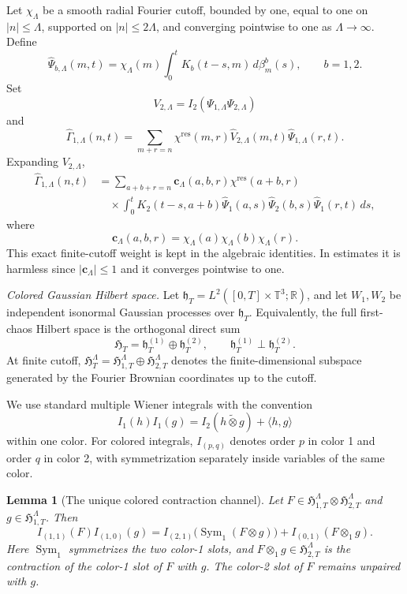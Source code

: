 \documentclass[10pt]{amsart}
\numberwithin{equation}{section}
\theoremstyle{plain}
\newtheorem{lemma}[theorem]{Lemma}
\theoremstyle{definition}
\theoremstyle{remark}
\newcommand{\T}{\mathbb{T}}
\newcommand{\R}{\mathbb{R}}
\newcommand{\wh}{\widehat}
\newcommand{\HH}{\mathfrak{H}}
\newcommand{\hh}{\mathfrak{h}}
\providecommand{\Sym}{\operatorname{Sym}}
\begin{document}
Let \(\chi_\Lambda\) be a smooth radial Fourier cutoff, bounded by one, equal to one on \(|n|\le \Lambda\), supported on \(|n|\le2\Lambda\), and converging pointwise to one as \(\Lambda\to\infty\).  Define
\[
        \wh\Psi_{b,\Lambda}(m,t)
        =\chi_\Lambda(m)\int_0^tK_b(t-s,m)\,d\beta_m^b(s),
        \qquad b=1,2.
\]
Set
\[
        V_{2,\Lambda}=I_2(\Psi_{1,\Lambda}\Psi_{2,\Lambda})
\]
and
\begin{equation}\label{C:Gamma-cutoff-def}
        \wh\Gamma_{1,\Lambda}(n,t)
        =\sum_{m+r=n}\chi^{\mathrm{res}}(m,r)
        \wh V_{2,\Lambda}(m,t)\wh\Psi_{1,\Lambda}(r,t).
\end{equation}
Expanding \(V_{2,\Lambda}\),
\begin{equation}\label{C:Gamma-expanded}
\begin{aligned}
        \wh\Gamma_{1,\Lambda}(n,t)
        & =
        \sum_{a+b+r=n}
        \mathbf c_\Lambda(a,b,r)
        \chi^{\mathrm{res}}(a+b,r)                                      \\
        &\quad\times
        \int_0^t K_2(t-s,a+b)
        \wh\Psi_1(a,s)\wh\Psi_2(b,s)\wh\Psi_1(r,t)\,ds,
\end{aligned}
\end{equation}
where
\[
        \mathbf c_\Lambda(a,b,r)=\chi_\Lambda(a)\chi_\Lambda(b)\chi_\Lambda(r).
\]
This exact finite-cutoff weight is kept in the algebraic identities.  In estimates it is harmless since \(|\mathbf c_\Lambda|\le1\) and it converges pointwise to one.

\medskip
\noindent\emph{Colored Gaussian Hilbert space.}
Let \(\hh_T=L^2([0,T]\times\T^3;\R)\), and let \(W_1,W_2\) be independent isonormal Gaussian processes over \(\hh_T\).  Equivalently, the full first-chaos Hilbert space is the orthogonal direct sum
\[
        \HH_T=\hh_T^{(1)}\oplus\hh_T^{(2)},
        \qquad
        \hh_T^{(1)}\perp\hh_T^{(2)}.
\]
At finite cutoff, \(\HH_T^\Lambda=\HH_{1,T}^\Lambda\oplus\HH_{2,T}^\Lambda\) denotes the finite-dimensional subspace generated by the Fourier Brownian coordinates up to the cutoff.

We use standard multiple Wiener integrals with the convention
\[
        I_1(h)I_1(g)=I_2(h\widetilde\otimes g)+\langle h,g\rangle
\]
within one color.  For colored integrals, \(I_{(p,q)}\) denotes order \(p\) in color 1 and order \(q\) in color 2, with symmetrization separately inside variables of the same color.

\begin{lemma}[The unique colored contraction channel]\label{lem:C-colored-product}
Let \(F\in \HH_{1,T}^\Lambda\otimes\HH_{2,T}^\Lambda\) and \(g\in\HH_{1,T}^\Lambda\).  Then
\begin{equation}\label{C:colored-product}
        I_{(1,1)}(F)I_{(1,0)}(g)
        =I_{(2,1)}\bigl(\Sym_1(F\otimes g)\bigr)
        +I_{(0,1)}(F\otimes_1 g).
\end{equation}
Here \(\Sym_1\) symmetrizes the two color-1 slots, and \(F\otimes_1 g\in\HH_{2,T}^\Lambda\) is the contraction of the color-1 slot of \(F\) with \(g\).  The color-2 slot of \(F\) remains unpaired with \(g\).
\end{lemma}
\end{document}
